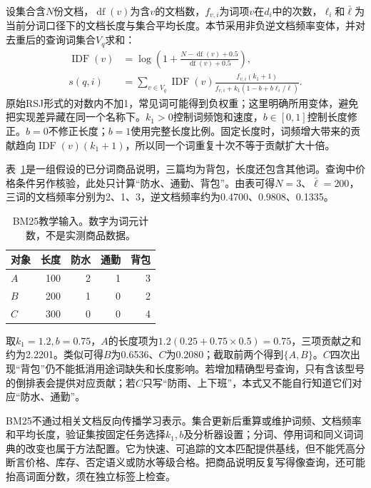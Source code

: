 设集合含$N$份文档，$\operatorname{df}(v)$为含$v$的文档数，$f_{v,i}$为词项$v$在$d_i$中的次数，$\ell_i$和$\bar\ell$为当前分词口径下的文档长度与集合平均长度。本节采用非负逆文档频率变体，并对去重后的查询词集合$V_q$求和：
\begin{equation}
 \begin{split}
 \operatorname{IDF}(v)&=\log\left(1+\frac{N-\operatorname{df}(v)+0.5}
                                      {\operatorname{df}(v)+0.5}\right),\\
 s(q,i)&=\sum_{v\in V_q}\operatorname{IDF}(v)
 \frac{f_{v,i}(k_1+1)}
 {f_{v,i}+k_1(1-b+b\ell_i/\bar\ell)} .
 \end{split}
 \label{eq:rs-search-bm25}
\end{equation}
原始RSJ形式的对数内不加1，常见词可能得到负权重；这里明确所用变体，避免把实现差异藏在同一个名称下。$k_1>0$控制词频饱和速度，$b\in[0,1]$控制长度修正。$b=0$不修正长度；$b=1$使用完整长度比例。固定长度时，词频增大带来的贡献趋向$\operatorname{IDF}(v)(k_1+1)$，所以同一个词重复十次不等于贡献扩大十倍。

表~\ref{tab:rs-search-bm25-example}是一组假设的已分词商品说明，三篇均为背包，长度还包含其他词。查询中价格条件另作核验，此处只计算“防水、通勤、背包”。由表可得$N=3$、$\bar\ell=200$，三词的文档频率分别为2、1、3，逆文档频率约为0.4700、0.9808、0.1335。
\begin{table}[htbp]
 \centering
 \begin{tabular}{lrrrr}
  \toprule
  对象 & 长度 & 防水 & 通勤 & 背包 \\
  \midrule
  $A$ & 100 & 2 & 1 & 3 \\
  $B$ & 200 & 1 & 0 & 2 \\
  $C$ & 300 & 0 & 0 & 4 \\
  \bottomrule
 \end{tabular}
 \caption{BM25教学输入。数字为词元计数，不是实测商品数据。}
 \label{tab:rs-search-bm25-example}
\end{table}

取$k_1=1.2,b=0.75$，$A$的长度项为$1.2(0.25+0.75\times0.5)=0.75$，三项贡献之和约为2.2201。类似可得$B$为0.6536、$C$为0.2080；截取前两个得到$\{A,B\}$。$C$四次出现“背包”仍不能抵消用途词缺失和长度影响。若增加精确型号查询，只有含该型号的倒排表会提供对应贡献；若$C$只写“防雨、上下班”，本式又不能自行知道它们对应“防水、通勤”。

BM25不通过相关文档反向传播学习表示。集合更新后重算或维护词频、文档频率和平均长度，验证集按固定任务选择$k_1,b$及分析器设置；分词、停用词和同义词词典的改变也属于方法配置。它为快速、可追踪的文本匹配提供基线，但不能凭高分断言价格、库存、否定语义或防水等级合格。把商品说明反复写得像查询，还可能抬高词面分数，须在独立标签上检查。

